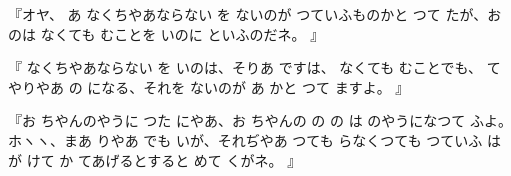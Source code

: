 『オヤ、
あ
なくちやあならない
を
ないのが
つていふものかと
つて
たが、お
のは
なくても
むことを
いのに
といふのだネ。
』

『
なくちやあならない
を
いのは、そりあ
ですは、
なくても
むことでも、
てやりやあ
の
になる、それを
ないのが
あ
かと
つて
ますよ。
』

『お
ちやんのやうに
つた
にやあ、お
ちやんの
の
の
は
のやうになつて
ふよ。
ホヽヽ、まあ
りやあ
でも
いが、それぢやあ
つても
らなくつても
つていふ
は
が
けて
か
てあげるとすると
めて
くがネ。
』

